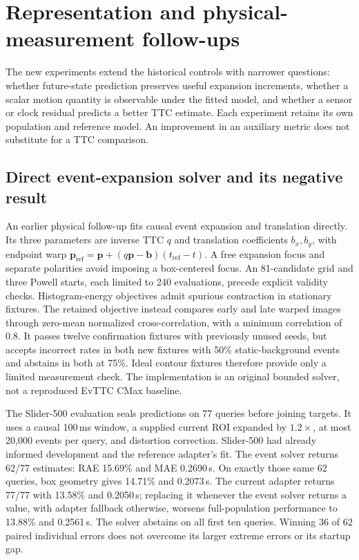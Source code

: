 \section{Representation and physical-measurement follow-ups}
\label{app:physics-followup}
The new experiments extend the historical controls with narrower questions: whether future-state prediction preserves useful expansion increments, whether a scalar motion quantity is observable under the fitted model, and whether a sensor or clock residual predicts a better TTC estimate. Each experiment retains its own population and reference model. An improvement in an auxiliary metric does not substitute for a TTC comparison. 

\subsection{Direct event-expansion solver and its negative result}
An earlier physical follow-up fits causal event expansion and translation directly. Its three parameters are inverse TTC $q$ and translation coefficients $b_x,b_y$, with endpoint warp $\mathbf p_{\mathrm{ref}}=\mathbf p+(q\mathbf p-\mathbf b)(t_{\mathrm{ref}}-t)$. A free expansion focus and separate polarities avoid imposing a box-centered focus. An 81-candidate grid and three Powell starts, each limited to 240 evaluations, precede explicit validity checks. Histogram-energy objectives admit spurious contraction in stationary fixtures. The retained objective instead compares early and late warped images through zero-mean normalized cross-correlation, with a minimum correlation of 0.8. It passes twelve confirmation fixtures with previously unused seeds, but accepts incorrect rates in both new fixtures with 50\% static-background events and abstains in both at 75\%. Ideal contour fixtures therefore provide only a limited measurement check. The implementation is an original bounded solver, not a reproduced EvTTC CMax baseline. 

The Slider-500 evaluation seals predictions on 77 queries before joining targets. It uses a causal 100\,ms window, a supplied current ROI expanded by $1.2\times$, at most 20,000 events per query, and distortion correction. Slider-500 had already informed development and the reference adapter's fit. The event solver returns 62/77 estimates: RAE 15.69\% and MAE 0.2690\,s. On exactly those same 62 queries, box geometry gives 14.71\% and 0.2073\,s. The current adapter returns 77/77 with 13.58\% and 0.2050\,s; replacing it whenever the event solver returns a value, with adapter fallback otherwise, worsens full-population performance to 13.88\% and 0.2561\,s. The solver abstains on all first ten queries. Winning 36 of 62 paired individual errors does not overcome its larger extreme errors or its startup gap. 

